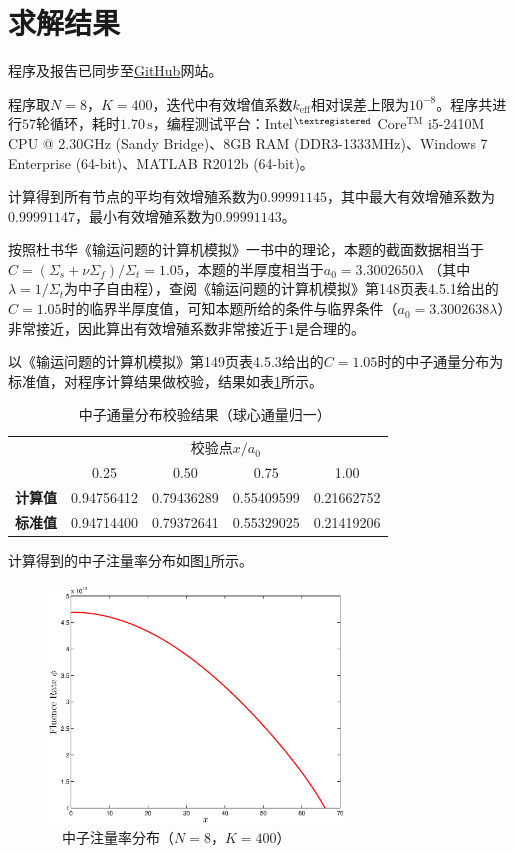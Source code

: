 \documentclass[a4paper,10.5pt]{article}
\begin{document}
\section{求解结果}
程序及报告已同步至\href{https://github.com/sunxb10/One-Dimensional-SN}{GitHub}网站。\par
程序取$N=8$，$K=400$，迭代中有效增值系数$k_{\mathrm{eff}}$相对误差上限为$10^{-8}$。程序共进行$57$轮循环，耗时$1.70\,\mathrm{s}$，编程测试平台：Intel$ {}^{\textregistered}$ Core${}^{\mathrm{TM}}$ i5-2410M CPU @ 2.30GHz (Sandy Bridge)、8GB RAM (DDR3-1333MHz)、Windows 7 Enterprise (64-bit)、MATLAB R2012b (64-bit)。\par
计算得到所有节点的平均有效增殖系数为$0.99991145$，其中最大有效增殖系数为$0.99991147$，最小有效增殖系数为$0.99991143$。\par
按照杜书华《输运问题的计算机模拟》一书中的理论，本题的截面数据相当于$C=(\Sigma_{s}+\nu\Sigma_{f})/\Sigma_{t}=1.05$，本题的半厚度相当于$a_{0}=3.3002650\lambda$ （其中$\lambda=1/\Sigma_{t}$为中子自由程），查阅《输运问题的计算机模拟》第148页表4.5.1给出的$C=1.05$时的临界半厚度值，可知本题所给的条件与临界条件（$a_{0}=3.3002638\lambda$）非常接近，因此算出有效增殖系数非常接近于$1$是合理的。\par
以《输运问题的计算机模拟》第149页表4.5.3给出的$C=1.05$时的中子通量分布为标准值，对程序计算结果做校验，结果如表\ref{tb:01}所示。\par
\begin{table}[htbp]
\centering
\caption{$\quad$中子通量分布校验结果（球心通量归一）}
\label{tb:01}
\begin{tabular}{c|c|c|c|c}
\hline
& \multicolumn{4}{|c}{校验点$x/a_{0}$}\\
\cline{2-5}
& 0.25 & 0.50 & 0.75 & 1.00\\
\hline
\textbf{计算值} & 0.94756412 & 0.79436289 & 0.55409599 & 0.21662752\\
\hline
\textbf{标准值} & 0.94714400 & 0.79372641 & 0.55329025 & 0.21419206\\
\hline
\end{tabular}
\end{table}
计算得到的中子注量率分布如图\ref{fg:phi-rate-dist}所示。
\begin{figure}[htbp]
\centering
\includegraphics[width=0.7\textwidth]{1D_plane_neutron_flux.eps}
\caption{$\quad$中子注量率分布（$N=8$，$K=400$）}
\label{fg:phi-rate-dist}
\end{figure}
\end{document}
